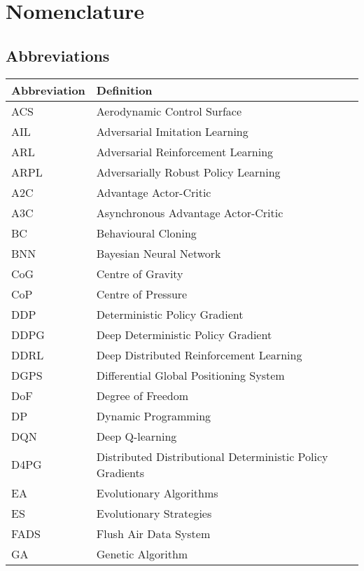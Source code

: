 \chapter*{Nomenclature}

\section*{Abbreviations}

\begin{longtable}{p{2.5cm}p{12cm}}
    \toprule
    Abbreviation & Definition \\
    \midrule\endhead %
    ACS & Aerodynamic Control Surface \\ %
    AIL & Adversarial Imitation Learning \\ %
    ARL & Adversarial Reinforcement Learning \\ %
    ARPL & Adversarially Robust Policy Learning \\ %
    A2C & Advantage Actor-Critic \\ %
    A3C & Asynchronous Advantage Actor-Critic \\ %
    BC & Behavioural Cloning \\ %
    BNN & Bayesian Neural Network \\ %
    CoG & Centre of Gravity \\ %
    CoP & Centre of Pressure \\ %
    DDP & Deterministic Policy Gradient \\ %
    DDPG & Deep Deterministic Policy Gradient \\ %
    DDRL & Deep Distributed Reinforcement Learning \\ %
    DGPS & Differential Global Positioning System \\ %
    DoF & Degree of Freedom \\ %
    DP & Dynamic Programming \\ %
    DQN & Deep Q-learning \\ %
    D4PG & Distributed Distributional Deterministic Policy Gradients \\ %
    EA & Evolutionary Algorithms \\ %
    ES & Evolutionary Strategies \\ %
    FADS & Flush Air Data System \\ %
    GA & Genetic Algorithm \\ %

\end{longtable}
